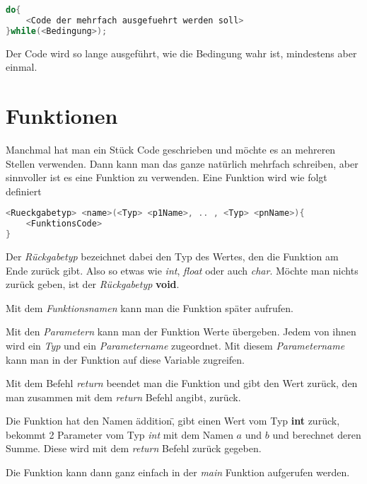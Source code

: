 \documentclass[c_worksheet.tex]{subfiles}
\begin{document}
\begin{lstlisting}[language=c]
do{
 	<Code der mehrfach ausgefuehrt werden soll>
}while(<Bedingung>);
\end{lstlisting} 

Der Code wird so lange ausgeführt, wie die Bedingung wahr ist, mindestens aber einmal.





\section{Funktionen}

Manchmal hat man ein Stück Code geschrieben und möchte es an mehreren Stellen verwenden. Dann kann man das ganze natürlich mehrfach schreiben, aber sinnvoller ist es eine Funktion zu verwenden. Eine Funktion wird wie folgt definiert

\begin{lstlisting}[language=c]
<Rueckgabetyp> <name>(<Typ> <p1Name>, .. , <Typ> <pnName>){
	<FunktionsCode>
}
\end{lstlisting}

Der \emph{Rückgabetyp} bezeichnet dabei den Typ des Wertes, den die Funktion am Ende zurück gibt. Also so etwas wie \emph{int}, \emph{float} oder auch \emph{char}. Möchte man nichts zurück geben, ist der \emph{Rückgabetyp} \textbf{void}.

Mit dem \emph{Funktionsnamen} kann man die Funktion später aufrufen.

Mit den \emph{Parametern} kann man der Funktion Werte übergeben. Jedem von ihnen wird ein \emph{Typ} und ein \emph{Parametername} zugeordnet. Mit diesem \emph{Parametername} kann man in der Funktion auf diese Variable zugreifen.

Mit dem Befehl \emph{return} beendet man die Funktion und gibt den Wert zurück, den man zusammen mit dem \emph{return} Befehl angibt, zurück.


 

Die Funktion hat den Namen \"addition\", gibt einen Wert vom Typ \textbf{int} zurück, bekommt 2 Parameter vom Typ \emph{int} mit dem Namen \(a\) und \(b\) und berechnet deren Summe. Diese wird mit dem \emph{return} Befehl zurück gegeben.

Die Funktion kann dann ganz einfach in der \emph{main} Funktion aufgerufen werden.
\end{document}
